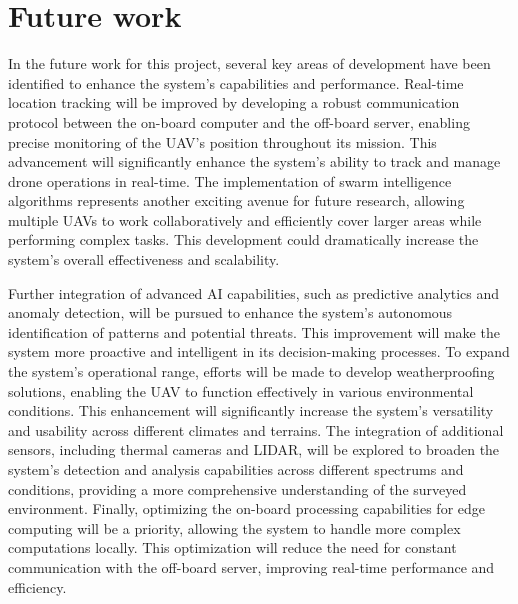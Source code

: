 \chapter{Future work}\label{ch:future_work}

In the future work for this project, several key areas of development have been identified to enhance the system's capabilities and performance. Real-time location tracking will be improved by developing a robust communication protocol between the on-board computer and the off-board server, enabling precise monitoring of the UAV's position throughout its mission. This advancement will significantly enhance the system's ability to track and manage drone operations in real-time. The implementation of swarm intelligence algorithms represents another exciting avenue for future research, allowing multiple UAVs to work collaboratively and efficiently cover larger areas while performing complex tasks. This development could dramatically increase the system's overall effectiveness and scalability.

Further integration of advanced AI capabilities, such as predictive analytics and anomaly detection, will be pursued to enhance the system's autonomous identification of patterns and potential threats. This improvement will make the system more proactive and intelligent in its decision-making processes. To expand the system's operational range, efforts will be made to develop weatherproofing solutions, enabling the UAV to function effectively in various environmental conditions. This enhancement will significantly increase the system's versatility and usability across different climates and terrains. The integration of additional sensors, including thermal cameras and LIDAR, will be explored to broaden the system's detection and analysis capabilities across different spectrums and conditions, providing a more comprehensive understanding of the surveyed environment. Finally, optimizing the on-board processing capabilities for edge computing will be a priority, allowing the system to handle more complex computations locally. This optimization will reduce the need for constant communication with the off-board server, improving real-time performance and efficiency.
